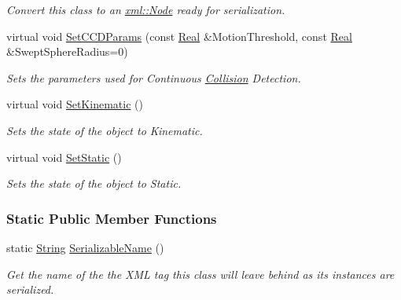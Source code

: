 \begin{DoxyCompactItemize}
\begin{DoxyCompactList}\small\item\em Convert this class to an \hyperlink{classMezzanine_1_1xml_1_1Node}{xml::Node} ready for serialization. \item\end{DoxyCompactList}\item 
virtual void \hyperlink{classMezzanine_1_1ActorBasePhysicsSettings_a702a20cfb7d87dbc2a7d44ba9260ead2}{SetCCDParams} (const \hyperlink{namespaceMezzanine_a726731b1a7df72bf3583e4a97282c6f6}{Real} \&MotionThreshold, const \hyperlink{namespaceMezzanine_a726731b1a7df72bf3583e4a97282c6f6}{Real} \&SweptSphereRadius=0)
\begin{DoxyCompactList}\small\item\em Sets the parameters used for Continuous \hyperlink{classMezzanine_1_1Collision}{Collision} Detection. \item\end{DoxyCompactList}\item 
virtual void \hyperlink{classMezzanine_1_1ActorBasePhysicsSettings_a3b01243f038e30eb39b04f8e38fb8a14}{SetKinematic} ()
\begin{DoxyCompactList}\small\item\em Sets the state of the object to Kinematic. \item\end{DoxyCompactList}\item 
virtual void \hyperlink{classMezzanine_1_1ActorBasePhysicsSettings_ac72f39fa6bc9e2f050fdf90e42dd0deb}{SetStatic} ()
\begin{DoxyCompactList}\small\item\em Sets the state of the object to Static. \item\end{DoxyCompactList}\end{DoxyCompactItemize}
\subsubsection*{Static Public Member Functions}
\begin{DoxyCompactItemize}
\item 
static \hyperlink{namespaceMezzanine_acf9fcc130e6ebf08e3d8491aebcf1c86}{String} \hyperlink{classMezzanine_1_1ActorBasePhysicsSettings_aa386f1bf24f1cc09fceba5d337c3ab29}{SerializableName} ()
\begin{DoxyCompactList}\small\item\em Get the name of the the XML tag this class will leave behind as its instances are serialized. \item\end{DoxyCompactList}\end{DoxyCompactItemize}


